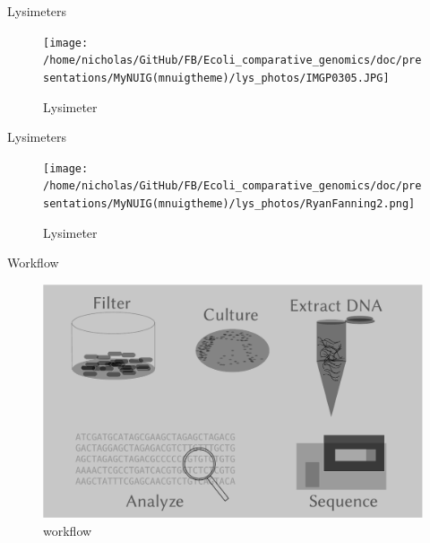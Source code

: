 \documentclass[17pt,aspectratio=169]{beamer}
\begin{document}
\begin{frame}[label=sec-10]{Lysimeters}
\begin{figure}[htb]
\centering
\texttt{[image: /home/nicholas/GitHub/FB/Ecoli\_comparative\_genomics/doc/presentations/MyNUIG(mnuigtheme)/lys\_photos/IMGP0305.JPG]}
\caption{\label{fig:lys3}Lysimeter}
\end{figure}
\end{frame}

\begin{frame}[label=sec-11]{Lysimeters}
\begin{figure}[htb]
\centering
\texttt{[image: /home/nicholas/GitHub/FB/Ecoli\_comparative\_genomics/doc/presentations/MyNUIG(mnuigtheme)/lys\_photos/RyanFanning2.png]}
\caption{\label{fig:lys3}Lysimeter}
\end{figure}
\end{frame}



\begin{frame}[label=sec-12]{Workflow}
\begin{figure}[htb]
\centering
\includegraphics[width=.86\textwidth]{./frequentFigs/workflow_v1.pdf}
\caption{\label{fig:workflow}workflow}
\end{figure}
\end{frame}
\end{document}

